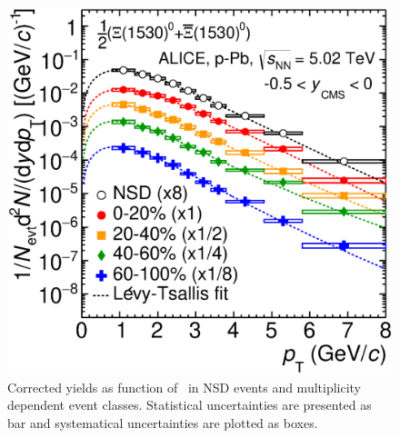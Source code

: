 \begin{figure}[htbp]
\begin{center}
\includegraphics[width=12.0cm]{./Version1/FigChapter5/Spectra/SpectraStatSys.eps}
\caption{Corrected yields as function of \pt~in NSD events and multiplicity dependent event classes. Statistical uncertainties are presented as bar and systematical uncertainties are plotted as boxes.} 
\label{fig:pPb:spectrasysstat}
\end{center}
\end{figure}





